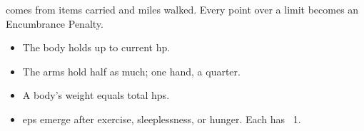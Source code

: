 \subsubsection*{}
comes from items carried and miles walked.
Every point over a limit becomes an Encumbrance Penalty.

\begin{itemize}
  \item
  The body holds  up to current \gls{hp}.
  \item
  The arms hold half as much; one hand, a quarter.
  \item
  A body's \gls{weight} equals total \glspl{hp}.
  \item
  \Glspl{ep} emerge after exercise, sleeplessness, or hunger.
  Each has ~1.
\end{itemize}
